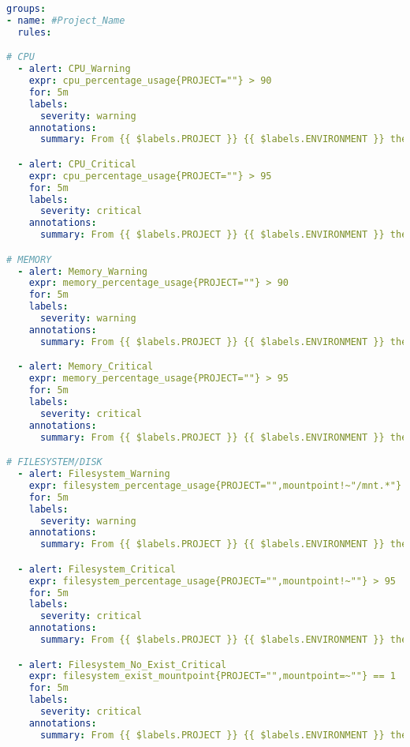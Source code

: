 \raggedbottom
\begin{lstlisting}[language=yaml,caption={Fichero estándar de configuración de alertas en Prometheus}, label={lst:standar.yml}]
groups:
- name: #Project_Name
  rules:

# CPU
  - alert: CPU_Warning
    expr: cpu_percentage_usage{PROJECT=""} > 90
    for: 5m
    labels:
      severity: warning
    annotations:
      summary: From {{ $labels.PROJECT }} {{ $labels.ENVIRONMENT }} the host {{ $labels.HOST }} has {{ humanize $value }}% CPU warning usage.

  - alert: CPU_Critical
    expr: cpu_percentage_usage{PROJECT=""} > 95
    for: 5m
    labels:
      severity: critical
    annotations:
      summary: From {{ $labels.PROJECT }} {{ $labels.ENVIRONMENT }} the host {{ $labels.HOST }} has {{ humanize $value }}% CPU critical usage.

# MEMORY
  - alert: Memory_Warning
    expr: memory_percentage_usage{PROJECT=""} > 90
    for: 5m
    labels:
      severity: warning
    annotations:
      summary: From {{ $labels.PROJECT }} {{ $labels.ENVIRONMENT }} the host {{ $labels.HOST }} has {{ humanize $value }}% Memory warning usage.

  - alert: Memory_Critical
    expr: memory_percentage_usage{PROJECT=""} > 95
    for: 5m
    labels:
      severity: critical
    annotations:
      summary: From {{ $labels.PROJECT }} {{ $labels.ENVIRONMENT }} the host {{ $labels.HOST }} has {{ humanize $value }}% Memory critical usage.

# FILESYSTEM/DISK
  - alert: Filesystem_Warning
    expr: filesystem_percentage_usage{PROJECT="",mountpoint!~"/mnt.*"} > 90
    for: 5m
    labels:
      severity: warning
    annotations:
      summary: From {{ $labels.PROJECT }} {{ $labels.ENVIRONMENT }} the host {{ $labels.HOST }} has {{ humanize $value }}% usage in {{ $labels.mountpoint }} [warning usage].

  - alert: Filesystem_Critical
    expr: filesystem_percentage_usage{PROJECT="",mountpoint!~""} > 95
    for: 5m
    labels:
      severity: critical
    annotations:
      summary: From {{ $labels.PROJECT }} {{ $labels.ENVIRONMENT }} the host {{ $labels.HOST }} has {{ humanize $value }}% usage in {{ $labels.mountpoint }} [critical usage].

  - alert: Filesystem_No_Exist_Critical
    expr: filesystem_exist_mountpoint{PROJECT="",mountpoint=~""} == 1
    for: 5m
    labels:
      severity: critical
    annotations:
      summary: From {{ $labels.PROJECT }} {{ $labels.ENVIRONMENT }} the host {{ $labels.HOST }} {{ $labels.mountpoint }} not found.


\end{lstlisting}
